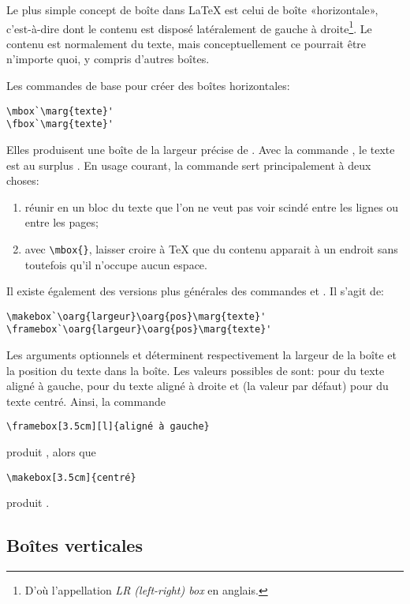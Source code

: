 Le plus simple concept de boîte dans {\LaTeX} est celui de boîte
«horizontale», c'est-à-dire dont le contenu est disposé latéralement
de gauche à droite\footnote{%
  D'où l'appellation \emph{LR (left-right) box} en anglais.}. %
Le contenu est normalement du texte, mais conceptuellement ce pourrait
être n'importe quoi, y compris d'autres boîtes.

Les commandes de base pour créer des boîtes horizontales:
\begin{lstlisting}
\mbox`\marg{texte}'
\fbox`\marg{texte}'
\end{lstlisting}
Elles produisent une boîte de la largeur précise de . Avec
la commande \cmd{\fbox}, le texte est au surplus . En
usage courant, la commande  sert principalement à deux
choses:
\begin{enumerate}
\item réunir en un bloc du texte que l'on ne veut pas voir scindé
  entre les lignes ou entre les pages;
\item \label{item:tableaux:mbox} avec \verb=\mbox{}=, laisser croire à
  {\TeX} que du contenu apparait à un endroit sans toutefois qu'il
  n'occupe aucun espace.
\end{enumerate}

Il existe également des versions plus générales des commandes
\cmd{\mbox} et \cmd{\fbox}. Il s'agit de:
\begin{lstlisting}
\makebox`\oarg{largeur}\oarg{pos}\marg{texte}'
\framebox`\oarg{largeur}\oarg{pos}\marg{texte}'
\end{lstlisting}
Les arguments optionnels  et  déterminent
respectivement la largeur de la boîte et la position du texte
dans la boîte. Les valeurs possibles de  sont:  pour
du texte aligné à gauche,  pour du texte aligné à droite et
 (la valeur par défaut) pour du texte centré. Ainsi, la commande
\begin{lstlisting}
\framebox[3.5cm][l]{aligné à gauche}
\end{lstlisting}
produit , alors que
\begin{lstlisting}
\makebox[3.5cm]{centré}
\end{lstlisting}
produit .

\subsection{Boîtes verticales}

